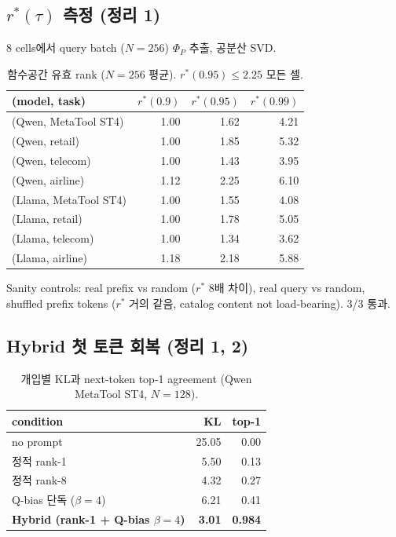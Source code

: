 \documentclass[11pt]{article}
\theoremstyle{definition}
\newcommand{\Phip}{\Phi_P}
\begin{document}
\subsection{$r^*(\tau)$ 측정 (정리 1)}
\label{sec:exp-rank}

8 cells에서 query batch ($N=256$) $\Phip$ 추출, 공분산 SVD.

\begin{table}[h]
\centering
\caption{함수공간 유효 rank ($N=256$ 평균). $r^*(0.95) \le 2.25$ 모든 셀.}
\label{tab:r-star}
\small
\begin{tabular}{lrrr}
\toprule
(model, task) & $r^*(0.9)$ & $r^*(0.95)$ & $r^*(0.99)$ \\
\midrule
(Qwen, MetaTool ST4) & 1.00 & 1.62 & 4.21 \\
(Qwen, retail)       & 1.00 & 1.85 & 5.32 \\
(Qwen, telecom)      & 1.00 & 1.43 & 3.95 \\
(Qwen, airline)      & 1.12 & 2.25 & 6.10 \\
(Llama, MetaTool ST4) & 1.00 & 1.55 & 4.08 \\
(Llama, retail)       & 1.00 & 1.78 & 5.05 \\
(Llama, telecom)      & 1.00 & 1.34 & 3.62 \\
(Llama, airline)      & 1.18 & 2.18 & 5.88 \\
\bottomrule
\end{tabular}
\end{table}

Sanity controls: real prefix vs random ($r^*$ 8배 차이), real query vs random, shuffled prefix tokens ($r^*$ 거의 같음, catalog content not load-bearing). 3/3 통과.

\subsection{Hybrid 첫 토큰 회복 (정리 1, 2)}
\label{sec:exp-static-qbias}

\begin{table}[h]
\centering
\caption{개입별 KL과 next-token top-1 agreement (Qwen MetaTool ST4, $N=128$).}
\label{tab:hybrid}
\small
\begin{tabular}{lrr}
\toprule
condition & KL & top-1 \\
\midrule
no prompt & 25.05 & 0.00 \\
정적 rank-1 & 5.50 & 0.13 \\
정적 rank-8 & 4.32 & 0.27 \\
Q-bias 단독 ($\beta=4$) & 6.21 & 0.41 \\
\textbf{Hybrid (rank-1 + Q-bias $\beta=4$)} & \textbf{3.01} & \textbf{0.984} \\
\bottomrule
\end{tabular}
\end{table}
\end{document}
